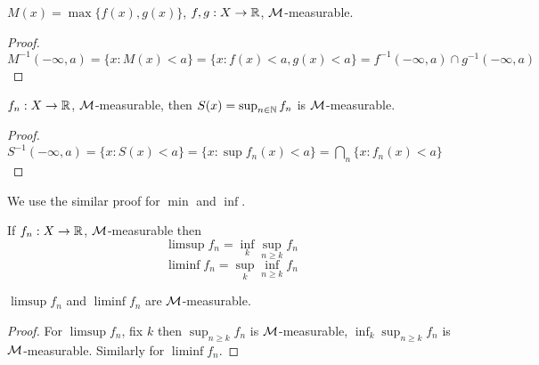 
\begin{claim}
  $M(x) = \max\{f(x), g(x)\}$, $f,g: X \to \mathbb R$, $\mathcal M$-measurable.
\end{claim}

\begin{proof}
  $M^{-1}(-\infty, a) = \{x : M(x) < a\} = \{x : f(x) < a, g(x) < a\} = f^{-1}(-\infty, a) \cap g^{-1}(-\infty, a)$
\end{proof}


\begin{claim}
  $f_n: X \to \mathbb R$, $\mathcal M$-measurable, then $S(x) = \sup_{n\in \mathbb N} f_n$ is $\mathcal M$-measurable.
\end{claim}

\begin{proof}
  $S^{-1}(-\infty, a) = \{x : S(x) < a\} = \{x : \sup f_n(x) < a\} = \bigcap_n \{x : f_n(x) < a\}$
\end{proof}


\begin{remark}
  We use the similar proof for $\min$ and $\inf$.
\end{remark}

\begin{definition}
If $f_n: X \to \mathbb R$, $\mathcal M$-measurable then \[\limsup f_n = \inf_k \sup_{n \ge k} f_n\]
\[\liminf f_n = \sup_k \inf_{n \ge k} f_n\]
\end{definition}

\begin{claim}
  $\limsup f_n$ and $\liminf f_n$ are $\mathcal M$-measurable.
\end{claim}

\begin{proof}
  For $\limsup f_n$, fix $k$ then $\displaystyle\sup_{n \ge k} f_n$ is $\mathcal M$-measurable, $\displaystyle\inf_k \displaystyle\sup_{n \ge k} f_n$ is $\mathcal M$-measurable.
  Similarly for $\liminf f_n$.
\end{proof}

